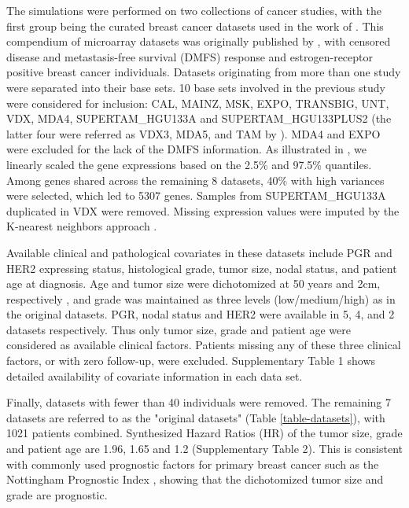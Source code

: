 \documentclass{bioinfo}
\begin{document}
  The simulations were performed on two collections of cancer studies, with the first group
   being the curated breast cancer datasets used in the work of \citet{Bernau2014}.
  This compendium of microarray datasets was originally published by \citet{Haibe-Kains2012},
  with censored disease and metastasis-free survival (DMFS) response 
  and estrogen-receptor positive breast cancer individuals. Datasets originating
  from more than one study were separated into their base sets. 10 base
  sets involved in the previous study were considered for inclusion:
  CAL, MAINZ, MSK, EXPO, TRANSBIG, UNT, VDX,
  MDA4, SUPERTAM\_HGU133A and SUPERTAM\_HGU133PLUS2 (the latter four
  were referred as VDX3, MDA5, and TAM by \citet{Bernau2014}). MDA4 and EXPO were
  excluded for the lack of the DMFS information. As illustrated in \citet{Haibe-Kains2012}, 
  we linearly scaled the gene expressions based on the 2.5\% and 97.5\% quantiles. Among genes
  shared across the remaining 8 datasets, 40\% with high variances 
  were selected, which led to 5307 genes. 
  Samples from SUPERTAM\_HGU133A duplicated in VDX were removed. 
  Missing expression values were imputed by the K-nearest neighbors approach \citep{KNN}.

  Available clinical and pathological covariates in these datasets include PGR and HER2 expressing status, histological
  grade, tumor size, nodal status, and patient age at diagnosis. Age and tumor size were
  dichotomized at 50 years and 2cm, respectively
  \citep{Haibe-Kains2012}, and grade was maintained as three levels
  (low/medium/high) as in the original datasets. 
PGR, nodal status and HER2 were available in 5, 4, and 2
  datasets respectively. Thus only tumor size, grade and patient age 
  were considered as available clinical factors. 
  Patients missing any of these three 
  clinical factors, or with zero follow-up, were
  excluded. Supplementary Table 1 shows detailed availability of covariate information in each data
  set.
  
  Finally, datasets with fewer than 40 individuals were
  removed. The remaining 7 datasets are referred to as the
  "original datasets" (Table \ref{table-datasets}), with 1021 patients combined. 
  Synthesized Hazard Ratios (HR) of the tumor size, grade and patient age are 1.96, 1.65 and 1.2 
  (Supplementary Table 2). This is consistent with commonly
  used prognostic factors for primary breast cancer such as the
  Nottingham Prognostic Index \citep{haybittle1982prognostic}, 
  showing that the dichotomized tumor size
  and grade are prognostic. 
     
\end{document}
